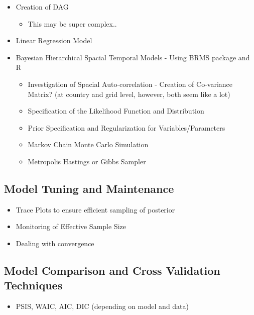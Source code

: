 \documentclass[12pt]{extarticle}
\begin{document}
\begin{itemize}
   \item Creation of DAG
   \begin{itemize}
     \item This may be super complex.. 
       \end{itemize}
     \end{itemize}   
\begin{itemize}
    \item Linear Regression Model
\end{itemize}
\begin{itemize}
   \item Bayesian Hierarchical Spacial Temporal Models - Using BRMS package and R
   \begin{itemize}
     \item Investigation of Spacial Auto-correlation - Creation of Co-variance Matrix? (at country and grid level, however, both seem like a lot)
     \item Specification of the Likelihood Function and Distribution
     \item Prior Specification and Regularization for Variables/Parameters
     \item Markov Chain Monte Carlo Simulation
     \item Metropolis Hastings or Gibbs Sampler

       \end{itemize}
     \end{itemize}   

\subsection{Model Tuning and Maintenance}
\begin{itemize}
    \item Trace Plots to ensure efficient sampling of posterior
    \item Monitoring of Effective Sample Size
    \item Dealing with convergence 
\end{itemize}

\subsection{Model Comparison and Cross Validation Techniques}
\begin{itemize}
    \item PSIS, WAIC, AIC, DIC (depending on model and data)
\end{itemize}
\end{document}
